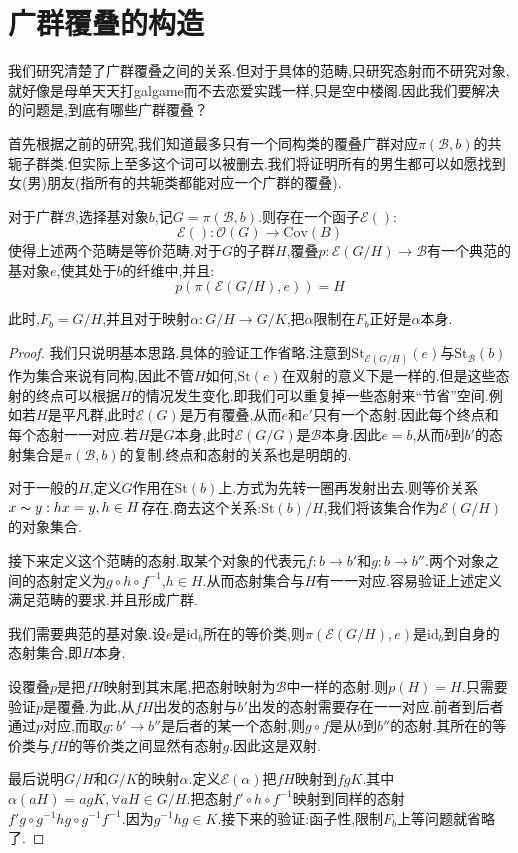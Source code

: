 \section{广群覆叠的构造}
我们研究清楚了广群覆叠之间的关系.但对于具体的范畴,只研究态射而不研究对象,就好像是母单天天打galgame而不去恋爱实践一样,只是空中楼阁.因此我们要解决的问题是,到底有哪些广群覆叠？

首先根据之前的研究,我们知道最多只有一个同构类的覆叠广群对应$\pi(\mathcal{B},b)$的共轭子群类.但实际上至多这个词可以被删去.我们将证明所有的男生都可以如愿找到女(男)朋友(指所有的共轭类都能对应一个广群的覆叠).

\begin{theorem}
    对于广群$\mathcal{B}$,选择基对象$b$,记$G=\pi(\mathcal{B},b)$.则存在一个函子$\mathcal{E}()$:
    $$
    \mathcal{E}():\mathcal{O}(G)\to \mathrm{Cov}(B)
    $$
    使得上述两个范畴是等价范畴.对于$G$的子群$H$,覆叠$p:\mathcal{E}(G/H) \to \mathcal{B}$有一个典范的基对象$e$,使其处于$b$的纤维中,并且:
    $$
    p(\pi(\mathcal{E}(G/H),e))=H
    $$

    此时,$F_b=G/H$,并且对于映射$\alpha:G/H \to G/K$,把$\mathcal{\alpha}$限制在$F_b$正好是$\alpha$本身.
\end{theorem}
\begin{proof}
    我们只说明基本思路.具体的验证工作省略.注意到$\mathrm{St}_{\mathcal{E}(G/H)}(e)$与$\mathrm{St}_\mathcal{B}(b)$作为集合来说有同构,因此不管$H$如何,$\mathrm{St}(e)$在双射的意义下是一样的.但是这些态射的终点可以根据$H$的情况发生变化.即我们可以重复掉一些态射来“节省”空间.例如若$H$是平凡群,此时$\mathcal{E}(G)$是万有覆叠,从而$e$和$e'$只有一个态射.因此每个终点和每个态射一一对应.若$H$是$G$本身,此时$\mathcal{E}(G/G)$是$\mathcal{B}$本身.因此$e=b$,从而$b$到$b'$的态射集合是$\pi(\mathcal{B},b)$的复制.终点和态射的关系也是明朗的.

    对于一般的$H$,定义$G$作用在$\mathrm{St}(b)$上.方式为先转一圈再发射出去.则等价关系$x \thicksim y:hx=y,h \in H$存在.商去这个关系:$\mathrm{St}(b)/H$,我们将该集合作为$\mathcal{E}(G/H)$的对象集合.

    接下来定义这个范畴的态射.取某个对象的代表元$f:b \to b'$和$g: b \to b''$.两个对象之间的态射定义为$ g \circ h \circ f^{-1}$,$h \in H$.从而态射集合与$H$有一一对应.容易验证上述定义满足范畴的要求.并且形成广群.

    我们需要典范的基对象.设$e$是$\mathrm{id}_b$所在的等价类,则$\pi(\mathcal{E}(G/H),e)$是$\mathrm{id}_b$到自身的态射集合,即$H$本身.

    设覆叠$p$是把$fH$映射到其末尾,把态射映射为$\mathcal{B}$中一样的态射.则$p(H)=H$.只需要验证$p$是覆叠.为此,从$fH$出发的态射与$b'$出发的态射需要存在一一对应.前者到后者通过$p$对应,而取$g:b' \to b''$是后者的某一个态射,则$g \circ f$是从$b$到$b''$的态射.其所在的等价类与$fH$的等价类之间显然有态射$g$.因此这是双射.

    最后说明$G/H$和$G/K$的映射$\alpha$.定义$\mathcal{E}(\alpha)$把$fH$映射到$fgK$.其中$\alpha(aH)=agK,\forall aH \in G/H$.把态射$f' \circ h \circ f^{-1}$映射到同样的态射$f'g \circ g^{-1}hg \circ g^{-1}f^{-1}$.因为$g^{-1}hg \in K$.接下来的验证:函子性,限制$F_b$上等问题就省略了.
\end{proof}
